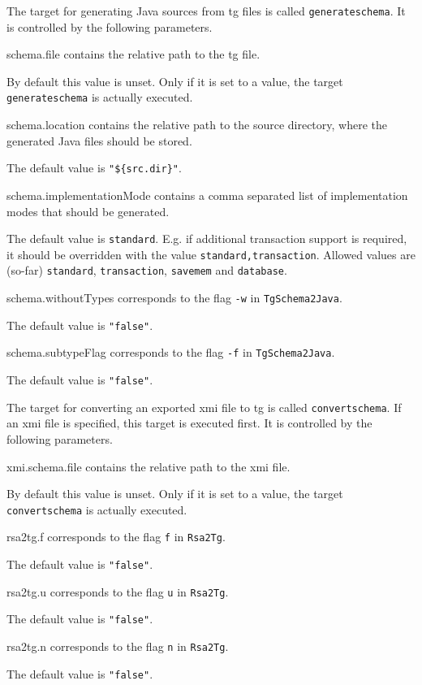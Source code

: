 \documentclass[a4paper,twoside,11pt,bibtotoc]{article}
\begin{document}
The target for generating Java sources from tg files is called \texttt{generateschema}.
It is controlled by the following parameters.

\begin{description*}
	\item[schema.file] contains the relative path to the tg file.\par By default this value is unset. Only if it is set to a value, the target \texttt{generateschema} is actually executed.
	\item[schema.location] contains the relative path to the source directory, where the generated Java files should be stored.\par The default value is \texttt{"\$\{src.dir\}"}.
	\item[schema.implementationMode] contains a comma separated list of implementation modes that should be generated.\par The default value is \texttt{standard}. E.g. if additional transaction support is required, it should be overridden with the value \texttt{standard,transaction}. Allowed values are (so-far) \texttt{standard}, \texttt{transaction}, \texttt{savemem} and \texttt{database}.
	\item[schema.withoutTypes] corresponds to the flag \texttt{-w} in \texttt{TgSchema2Java}.\par The default value is \texttt{"false"}.
	\item[schema.subtypeFlag] corresponds to the flag \texttt{-f} in \texttt{TgSchema2Java}.\par The default value is \texttt{"false"}.
\end{description*}

The target for converting an exported xmi file to tg is called \texttt{convertschema}.
If an xmi file is specified, this target is executed first.
It is controlled by the following parameters.

\begin{description*}
	\item[xmi.schema.file] contains the relative path to the xmi file.\par By default this value is unset. Only if it is set to a value, the target \texttt{convertschema} is actually executed.
	\item[rsa2tg.f] corresponds to the flag \texttt{f} in \texttt{Rsa2Tg}.\par The default value is \texttt{"false"}.
	\item[rsa2tg.u] corresponds to the flag \texttt{u} in \texttt{Rsa2Tg}.\par The default value is \texttt{"false"}.
	\item[rsa2tg.n] corresponds to the flag \texttt{n} in \texttt{Rsa2Tg}.\par The default value is \texttt{"false"}.
\end{description*}
\end{document}

